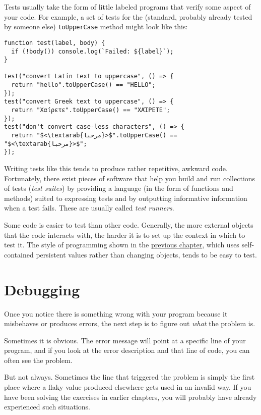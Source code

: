 Tests usually take the form of little labeled programs that verify some aspect of your code. For example, a set of tests for the (standard, probably already tested by someone else) \lstinline`toUpperCase` method might look like this:

\begin{lstlisting}
function test(label, body) {
  if (!body()) console.log(`Failed: ${label}`);
}

test("convert Latin text to uppercase", () => {
  return "hello".toUpperCase() == "HELLO";
});
test("convert Greek text to uppercase", () => {
  return "Χαίρετε".toUpperCase() == "ΧΑΊΡΕΤΕ";
});
test("don't convert case-less characters", () => {
  return "$<\textarab{مرحبا}>$".toUpperCase() == "$<\textarab{مرحبا}>$";
});
\end{lstlisting}
\noindent{}

Writing tests like this tends to produce rather repetitive, awkward code. Fortunately, there exist pieces of software that help you build and run collections of tests (\emph{test suites}) by providing a language (in the form of functions and methods) suited to expressing tests and by outputting informative information when a test fails. These are usually called \emph{test runners}.

Some code is easier to test than other code. Generally, the more external objects that the code interacts with, the harder it is to set up the context in which to test it. The style of programming shown in the \hyperref[robot]{previous chapter}, which uses self-contained persistent values rather than changing objects, tends to be easy to test.

\section{Debugging}

Once you notice there is something wrong with your program because it misbehaves or produces errors, the next step is to figure out \emph{what} the problem is.

Sometimes it is obvious. The error message will point at a specific line of your program, and if you look at the error description and that line of code, you can often see the problem.

But not always. Sometimes the line that triggered the problem is simply the first place where a flaky value produced elsewhere gets used in an invalid way. If you have been solving the exercises in earlier chapters, you will probably have already experienced such situations.

